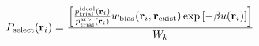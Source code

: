 \documentclass[12pt]{article}
\begin{document}
\begin{displaymath}
P_{\rm select}({\bf r}_i) = 
{{
\left[
{{p_{\rm trial}^{\rm ideal}({\bf r}_i)}\over{ p_{\rm trial}^{\rm arb}({\bf r}_i)}}
w_{\rm bias}({{\bf r}_i},{\bf r}_{\rm exist})
\exp\left[-\beta u({\bf r}_i)\right]
\right]
}
\over
{
W_k
}}
\end{displaymath}
\end{document}
